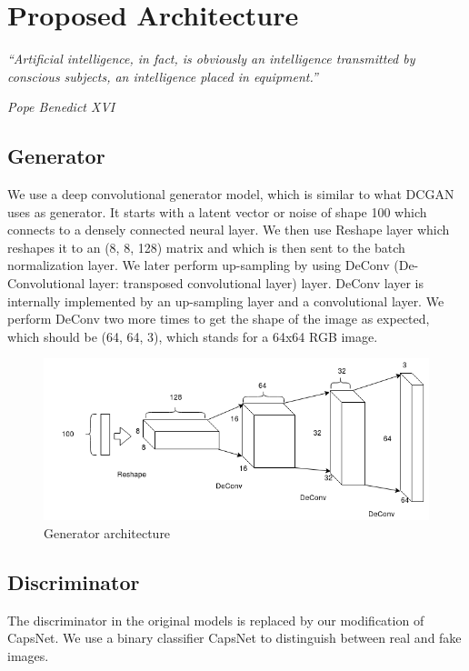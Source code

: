 \chapter{Proposed Architecture}\label{ch:proposed_architecture}
\epigraph{\textit{\normalsize “Artificial intelligence, in fact, is obviously an intelligence transmitted by conscious subjects, an intelligence placed in equipment.”}}{\textit{ \normalsize Pope Benedict XVI}}

\section{Generator} %
\label{sec:generator}
We use a deep convolutional generator model, which is similar to what DCGAN uses as generator. It starts with a latent vector or noise of shape 100 which connects to a densely connected neural layer. We then use Reshape layer which reshapes it to an (8, 8, 128) matrix and which is then sent to the batch normalization layer. We later perform up-sampling by using DeConv (De-Convolutional layer: transposed convolutional layer) layer. DeConv layer is internally implemented by an up-sampling layer and a convolutional layer. We perform DeConv two more times to get the shape of the image as expected, which should be (64, 64, 3), which stands for a 64x64 RGB image.
\begin{figure}[H]
\centering\includegraphics[width=1\textwidth]{images/Generator.png}
\caption{Generator architecture}
\label{fig:generator}
\end{figure} 



\section{Discriminator} %
\label{sec:discriminator}
The discriminator in the original models is replaced by our modification of CapsNet. We use a binary classifier CapsNet to distinguish between real and fake images. 

